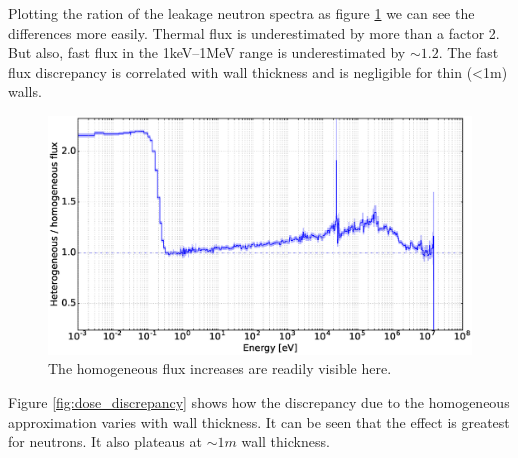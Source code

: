 Plotting the ration of the leakage neutron spectra as figure \ref{fig:relative_neutron_spectra} we can see the differences more easily. Thermal flux is underestimated by more than a factor 2. But also, fast flux in the 1keV--1MeV range is underestimated by $\sim1.2$. The fast flux discrepancy is correlated with wall thickness and is negligible for thin (\textless 1m) walls.

\begin{figure}[H]
	\includegraphics[width=\textwidth]{relative_neutron_spectra}
	\caption{The homogeneous flux increases are readily visible here.}
	\label{fig:relative_neutron_spectra}
\end{figure}


Figure \ref{fig:dose_discrepancy} shows how the discrepancy due to the homogeneous approximation varies with wall thickness. It can be seen that the effect is greatest for neutrons. It also plateaus at $\sim 1m$ wall thickness.

